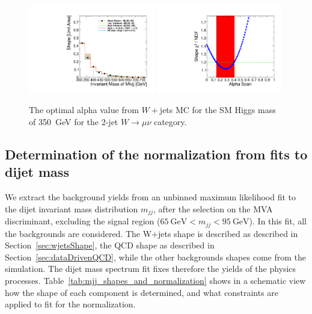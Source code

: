 %
\begin{figure}[!t]
  \centering
  \includegraphics[width=0.49\textwidth]{plots/anaexample/2j350mu-Alpha-mcget-MVAgt_60_Range_12_300-780_SB_55-65_95-200.pdf}
  \includegraphics[width=0.49\textwidth]{plots/anaexample/2j350mu-Alpha-mcsca-MVAgt_60_Range_12_300-780_SB_55-65_95-200.pdf}
  \caption{\label{fig:mcalphacheck_2j350mu}The optimal alpha value
    from $W+$jets MC for the SM Higgs mass of 350~GeV for the 2-jet
    $W\to\mu\nu$ category.}
\end{figure}
%

\subsection{Determination of the normalization from fits to dijet mass}
\label{sec:mjjfitfornormal}

We extract the background yields from an unbinned maximum likelihood
fit to the dijet invariant mass distribution $m_{jj}$, after the selection on the MVA discriminant,
excluding the signal region ($65~{\mbox{GeV}} < m_{jj} < 95~{\mbox{GeV}}$). 
In this fit, all the backgrounds are considered. 
The W+jets shape is described as described in Section~\ref{sec:wjetsShape},
the QCD shape as described in Section~\ref{sec:dataDrivenQCD}, 
while the other backgrounds shapes come from the simulation.
The dijet mass spectrum fit fixes therefore the yields of the physics processes. 
Table~\ref{tab:mjj_shapes_and_normalization} shows in a schematic view how the 
shape of each component is determined, and what constraints 
are applied to fit for the normalization. 

